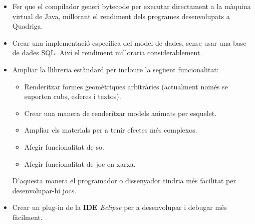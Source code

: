 \begin{itemize}
  \item Fer que el compilador generi bytecode per executar directament a la màquina virtual de Java, millorant el rendiment dels programes desenvolupats a Quadriga.
  \item Crear una implementació específica del model de dades, sense usar una base de dades SQL. Així el rendiment milloraria considerablement.
  \item Ampliar la llibreria estàndard per incloure la següent funcionalitat:
  \begin{itemize}
    \item Renderitzar formes geomètriques arbitràries (actualment només se suporten cubs, esferes i textos).
    \item Crear una manera de renderitzar models animats per esquelet.
    \item Ampliar els materials per a tenir efectes més complexos.
    \item Afegir funcionalitat de so.
    \item Afegir funcionalitat de joc en xarxa.
  \end{itemize}
  D'aquesta manera el programador o dissenyador tindria més facilitat per desenvolupar-hi jocs.
  \item Crear un plug-in de la {\bf IDE} {\em Eclipse} per a desenvolupar i debugar més fàcilment.
\end{itemize}